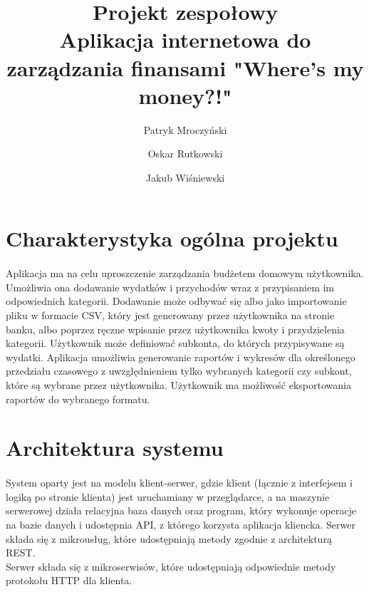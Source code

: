 \documentclass{article}
\title{\Huge{
		\indexspace Projekt zespołowy \\[1cm] 
		\indexspace Aplikacja internetowa do zarządzania finansami 
		\indexspace \textbf{"Where's my money?!"}}}
\author{Patryk Mroczyński \and Oskar Rutkowski \and Jakub Wiśniewski}
\begin{document}
	
	\maketitle
	\newpage
	\tableofcontents
	\newpage
	
	\section{Charakterystyka ogólna projektu}
	\paragraph{} Aplikacja ma na celu uproszczenie zarządzania budżetem domowym użytkownika. Umożliwia ona dodawanie wydatków i przychodów wraz z przypisaniem im odpowiednich kategorii. Dodawanie może odbywać się albo jako importowanie pliku w formacie CSV, który jest generowany przez użytkownika na stronie banku, albo poprzez ręczne wpisanie przez użytkownika kwoty i przydzielenia kategorii. Użytkownik może definiować subkonta, do których przypisywane są wydatki. Aplikacja umożliwia generowanie raportów i wykresów dla określonego przedziału czasowego z uwzględnieniem tylko wybranych kategorii czy subkont, które są wybrane przez użytkownika. Użytkownik ma możliwość eksportowania raportów do wybranego formatu.
	\section{Architektura systemu}
	\paragraph{} System oparty jest na modelu klient-serwer, gdzie klient (łącznie z interfejsem i logiką po stronie klienta) jest uruchamiany w przeglądarce, a na maszynie serwerowej działa relacyjna baza danych oraz program, który wykonuje operacje na bazie danych i udostępnia API, z którego korzysta aplikacja kliencka. Serwer składa się z mikrousług, które udostępniają metody zgodnie z architekturą REST. \\[0.5cm]
	Serwer składa się z mikroserwisów, które udostępniają odpowiednie metody protokołu HTTP dla klienta.
	
\end{document}
